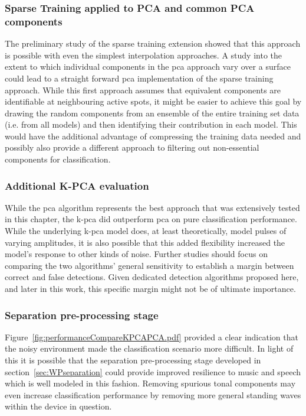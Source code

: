 \subsubsection{Sparse Training applied to PCA and common PCA components}
The preliminary study of the sparse training extension showed that this approach is possible with even the simplest interpolation approaches. A study into the extent to which individual components in the \gls{pca} approach vary over a surface could lead to a straight forward \gls{pca} implementation of the sparse training approach. While this first approach assumes that equivalent components are identifiable at neighbouring active spots, it might be easier to achieve this goal by drawing the random components from an ensemble of the entire training set data (i.e. from all models) and then identifying their contribution in each model. This would have the additional advantage of compressing the training data needed and possibly also provide a different approach to filtering out non-essential components for classification.

\subsubsection{Additional K-PCA evaluation}
While the \gls{pca} algorithm represents the best approach that was extensively tested in this chapter, the \gls{k-pca} did outperform \gls{pca} on pure classification performance. While the underlying \gls{k-pca} model does, at least theoretically, model pulses of varying amplitudes, it is also possible that this added flexibility increased the model's response to other kinds of noise. Further studies should focus on comparing the two algorithms' general sensitivity to establish a margin between correct and false detections. Given dedicated detection algorithms proposed here, and later in this work, this specific margin might not be of ultimate importance.

\subsubsection{Separation pre-processing stage}
Figure~\ref{fig:performanceCompareKPCAPCA.pdf} provided a clear indication that the noisy environment made the classification scenario more difficult. In light of this it is possible that the separation pre-processing stage developed in section~\ref{sec:WPseparation} could provide improved resilience to music and speech which is well modeled in this fashion. Removing spurious tonal components may even increase classification performance by removing more general standing waves within the device in question.


